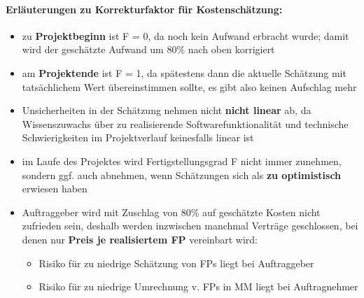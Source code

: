 \paragraph{Erläuterungen zu Korrekturfaktor für Kostenschätzung:}
\begin{itemize}
	\item zu \textbf{Projektbeginn} ist F = 0, da noch kein Aufwand erbracht wurde; damit wird der geschätzte Aufwand um 80\% nach oben korrigiert
	\item am \textbf{Projektende} ist F = 1, da spätestens dann die aktuelle Schätzung mit tatsächlichem Wert übereinstimmen sollte, es gibt also keinen Aufschlag mehr
	\item Unsicherheiten in der Schätzung nehmen nicht \textbf{nicht linear} ab, da Wissenszuwachs über zu realisierende Softwarefunktionalität und technische Schwierigkeiten im Projektverlauf keinesfalls linear ist
	\item im Laufe des Projektes wird Fertigstellungsgrad F nicht immer zunehmen, sondern ggf. auch abnehmen, wenn Schätzungen sich als \textbf{zu optimistisch} erwiesen haben
	\item Auftraggeber wird mit Zuschlag von 80\% auf geschätzte Kosten nicht zufrieden sein, deshalb werden inzwischen manchmal Verträge geschlossen, bei denen nur \textbf{Preis je realisiertem FP} vereinbart wird:
	\begin{itemize}
		\item Risiko für zu niedrige Schätzung von FPs liegt bei Auftraggeber
		\item Risiko für zu niedrige Umrechnung v. FPs in MM liegt bei Auftragnehmer
	\end{itemize}
\end{itemize}

